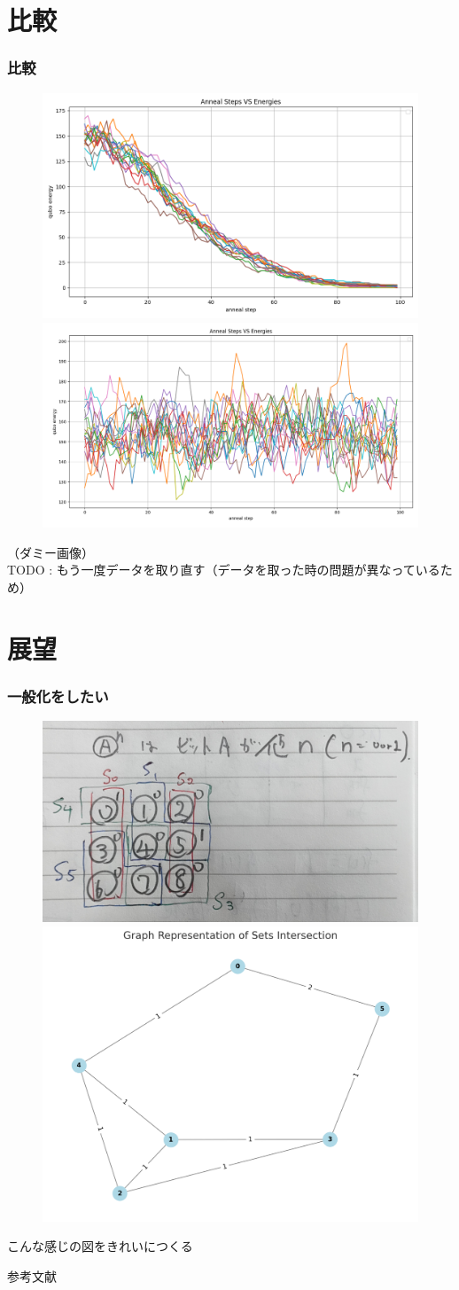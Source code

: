 \section{比較}
\begin{frame}
  \frametitle{比較}
  \begin{figure}
    \includegraphics[width=0.47\linewidth]{data/SSQA_ene.png}
    \includegraphics[width=0.47\linewidth]{data/SQAwithOnehot_ene.png}
  \end{figure}
  （ダミー画像）\\
  TODO : もう一度データを取り直す（データを取った時の問題が異なっているため）
\end{frame}

\section{展望}
\begin{frame}
  \frametitle{一般化をしたい}
  \begin{figure}
    \includegraphics[width=0.47\linewidth]{data/rakugaki1.jpg}
    \includegraphics[width=0.47\linewidth]{data/graph1.png}
  \end{figure}
  こんな感じの図をきれいにつくる
\end{frame}


\begin{frame}[t]{参考文献}
  \footnotesize

  
  
\end{frame}



